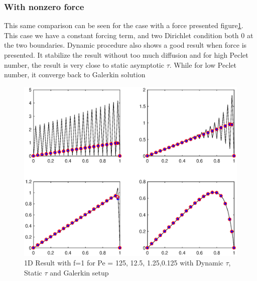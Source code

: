 \documentclass[10pt]{article}
\begin{document}
\subsubsection{With nonzero force}
This same comparison can be seen for the case with a force presented figure\ref{feq1}. This case we have a constant forcing term, and two Dirichlet condition both 0 at the two boundaries. Dynamic procedure also shows a good result when force is presented. It stabilize the result without too much diffusion and for high Peclet number, the result is very close to static asymptotic $\tau$. While for low Peclet number, it converge back to Galerkin solution
\begin{figure}[h!]
	\begin{center}
	\includegraphics[width=1.0\textwidth, clip]{./figure/feq1.eps}
	\end{center}
		\vspace{0mm}
    \caption{1D Result with f=1 for Pe = 125, 12.5, 1.25,0.125 with Dynamic $\tau$, Static $\tau$ and Galerkin setup}
  	\label{feq1}
\end{figure}
\end{document}
